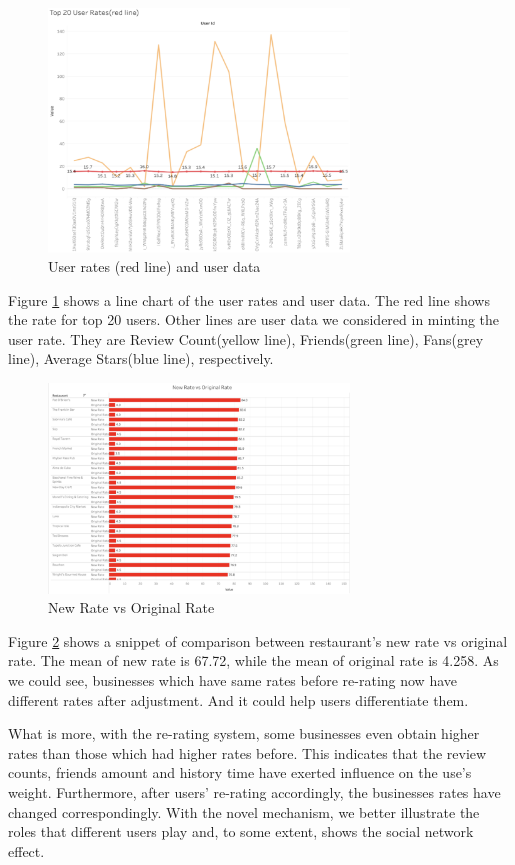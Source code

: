 \documentclass{stylefiles/capstone}
\begin{document}
\begin{figure}[htp]
    \centering
    \includegraphics[width=8cm]{asset/result_1.png}
    \caption{User rates (red line) and user data}
    \label{line_chart_figure}
\end{figure}

Figure \ref{line_chart_figure} shows a line chart of the user rates and user data.
The red line shows the rate for top 20 users. Other lines are user data we considered in minting the user rate. They are Review Count(yellow line), Friends(green line), Fans(grey line), Average Stars(blue line), respectively.

\begin{figure}[htp]
    \centering
    \includegraphics[width=8cm]{asset/result_2.png}
    \caption{New Rate vs Original Rate}
    \label{rate_comparasion_figure}
\end{figure}

Figure \ref{rate_comparasion_figure} shows a snippet of comparison between restaurant's new rate vs original rate. The mean of new rate is 67.72, while the mean of original rate is 4.258. As we could see, businesses which have same rates before re-rating now have different rates after adjustment. And it could help users differentiate them. 

What is more, with the re-rating system, some businesses even obtain higher rates than those which had higher rates before. This indicates that the review counts, friends amount and history time have exerted influence on the use's weight. Furthermore, after users' re-rating accordingly, the businesses rates have changed correspondingly. With the novel mechanism, we better illustrate the roles that different users play and, to some extent, shows the social network effect.    
\end{document}
